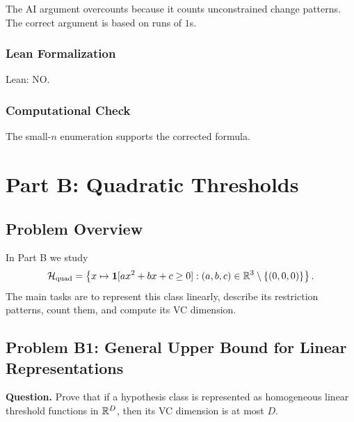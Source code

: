 \documentclass{article}
\newcommand{\classB}{\mathcal{H}_{\mathrm{quad}}}
\begin{document}
\begin{solutionbox}
The AI argument overcounts because it counts unconstrained change patterns. The
correct argument is based on runs of \(1\)s.

\subsubsection{Lean Formalization}

Lean: NO.

\subsubsection{Computational Check}

The small-\(n\) enumeration supports the corrected formula.

\end{solutionbox}

\section{Part B: Quadratic Thresholds}

\subsection{Problem Overview}

In Part B we study
\[
\classB
=
\left\{
x\mapsto \mathbf{1}[a x^2+b x+c\ge 0]
:
(a,b,c)\in\R^3\setminus\{(0,0,0)\}
\right\}.
\]
The main tasks are to represent this class linearly, describe its restriction
patterns, count them, and compute its VC dimension.

\subsection{Problem B1: General Upper Bound for Linear Representations}

\textbf{Question.}
\newline
Prove that if a hypothesis class is represented as homogeneous linear threshold
functions in \(\mathbb{R}^D\), then its VC dimension is at most \(D\).
\end{document}
